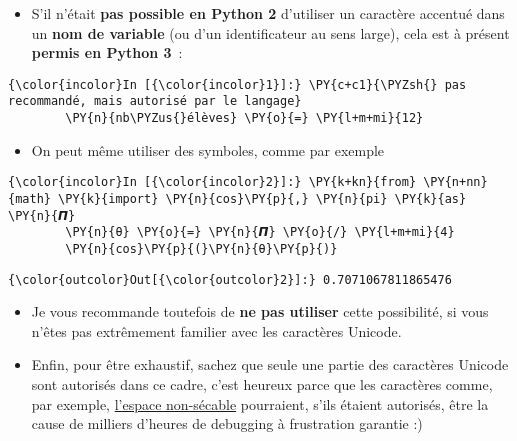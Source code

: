     \begin{itemize}
\tightlist
\item
  S'il n'était \textbf{pas possible en Python 2} d'utiliser un caractère
  accentué dans un \textbf{nom de variable} (ou d'un identificateur au
  sens large), cela est à présent \textbf{permis en Python 3}~:
\end{itemize}

    \begin{Verbatim}[commandchars=\\\{\},frame=single,framerule=0.3mm,rulecolor=\color{cellframecolor}]
{\color{incolor}In [{\color{incolor}1}]:} \PY{c+c1}{\PYZsh{} pas recommandé, mais autorisé par le langage}
        \PY{n}{nb\PYZus{}élèves} \PY{o}{=} \PY{l+m+mi}{12}
\end{Verbatim}


    \begin{itemize}
\tightlist
\item
  On peut même utiliser des symboles, comme par exemple
\end{itemize}

    \begin{Verbatim}[commandchars=\\\{\},frame=single,framerule=0.3mm,rulecolor=\color{cellframecolor}]
{\color{incolor}In [{\color{incolor}2}]:} \PY{k+kn}{from} \PY{n+nn}{math} \PY{k}{import} \PY{n}{cos}\PY{p}{,} \PY{n}{pi} \PY{k}{as} \PY{n}{𝞟}
        \PY{n}{θ} \PY{o}{=} \PY{n}{𝞟} \PY{o}{/} \PY{l+m+mi}{4}
        \PY{n}{cos}\PY{p}{(}\PY{n}{θ}\PY{p}{)}
\end{Verbatim}


\begin{Verbatim}[commandchars=\\\{\},frame=single,framerule=0.3mm,rulecolor=\color{cellframecolor}]
{\color{outcolor}Out[{\color{outcolor}2}]:} 0.7071067811865476
\end{Verbatim}
            
    \begin{itemize}
\tightlist
\item
  Je vous recommande toutefois de \textbf{ne pas utiliser} cette
  possibilité, si vous n'êtes pas extrêmement familier avec les
  caractères Unicode.
\end{itemize}

    \begin{itemize}
\tightlist
\item
  Enfin, pour être exhaustif, sachez que seule une partie des caractères
  Unicode sont autorisés dans ce cadre, c'est heureux parce que les
  caractères comme, par exemple,
  \href{http://www.fileformat.info/info/unicode/char/a0/index.htm}{l'espace
  non-sécable} pourraient, s'ils étaient autorisés, être la cause de
  milliers d'heures de debugging à frustration garantie :)
\end{itemize}

